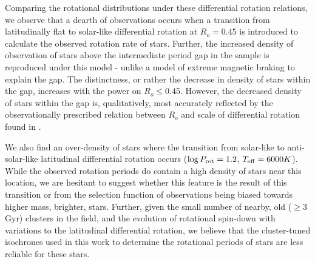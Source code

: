 Comparing the rotational distributions under these differential rotation relations, we observe that a dearth of observations occurs when a transition from latitudinally flat to solar-like differential rotation at $R_o = 0.45$ is introduced to calculate the observed rotation rate of stars.
Further, the increased density of observation of stars above the intermediate period gap in the \kepler{} sample is reproduced under this model - unlike a model of extreme magnetic braking to explain the gap.
The distinctness, or rather the decrease in density of stars within the gap, increases with the power on $R_o\leq 0.45$.
However, the decreased density of stars within the gap is, qualitatively, most accurately reflected by the observationally prescribed relation between $R_o$ and scale of differential rotation found in \citet{saar_starspots_2011}.

We also find an over-density of stars where the transition from solar-like to anti-solar-like latitudinal differential rotation occurs ($\log P_{\rm{rot}} = 1.2$, $T_{\rm{eff}} = 6000K$).
While the observed \kepler{} rotation periods do contain a high density of stars near this location, we are hesitant to suggest whether this feature is the result of this transition or from the selection function of \kepler{} observations being biased towards higher mass, brighter, stars.
Further, given the small number of nearby, old ($\geq$3 Gyr) clusters in the \kepler{} field, and the evolution of rotational spin-down with variations to the latitudinal differential rotation, we believe that the cluster-tuned isochrones used in this work to determine the rotational periods of stars are less reliable for these stars.

